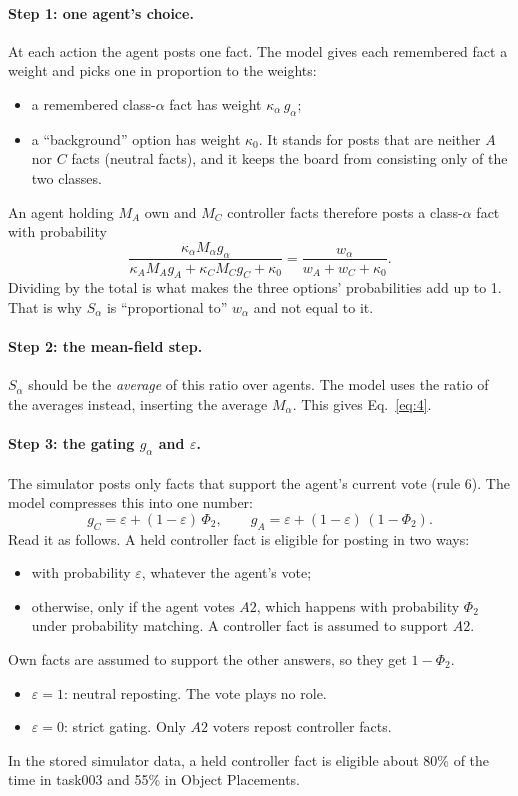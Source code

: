\documentclass[10pt,a4paper]{article}
\begin{document}
\paragraph{Step 1: one agent's choice.} At each action the agent posts one fact. The model gives each remembered fact a
weight and picks one in proportion to the weights:
\begin{itemize}
\item a remembered class-$\alpha$ fact has weight $\kappa_\alpha\,g_\alpha$;
\item a ``background'' option has weight $\kappa_0$. It stands for posts that are neither $A$ nor $C$ facts (neutral
  facts), and it keeps the board from consisting only of the two classes.
\end{itemize}
An agent holding $M_A$ own and $M_C$ controller facts therefore posts a class-$\alpha$ fact with probability
\begin{equation}
\frac{\kappa_\alpha M_\alpha g_\alpha}{\kappa_A M_A g_A+\kappa_C M_C g_C+\kappa_0}=\frac{w_\alpha}{w_A+w_C+\kappa_0}.
\end{equation}
Dividing by the total is what makes the three options' probabilities add up to 1. That is why $S_\alpha$ is
``proportional to'' $w_\alpha$ and not equal to it.

\paragraph{Step 2: the mean-field step.} $S_\alpha$ should be the \emph{average} of this ratio over agents. The model
uses the ratio of the averages instead, inserting the average $M_\alpha$. This gives Eq.~\eqref{eq:4}.

\paragraph{Step 3: the gating $g_\alpha$ and $\varepsilon$.} The simulator posts only facts that support the agent's
current vote (rule 6). The model compresses this into one number:
\begin{equation}
g_C=\varepsilon+(1-\varepsilon)\,\Phi_2,\qquad g_A=\varepsilon+(1-\varepsilon)\,(1-\Phi_2).\label{eq:g}
\end{equation}
Read it as follows. A held controller fact is eligible for posting in two ways:
\begin{itemize}
\item with probability $\varepsilon$, whatever the agent's vote;
\item otherwise, only if the agent votes $A2$, which happens with probability $\Phi_2$ under probability matching. A
  controller fact is assumed to support $A2$.
\end{itemize}
Own facts are assumed to support the other answers, so they get $1-\Phi_2$.
\begin{itemize}
\item $\varepsilon=1$: neutral reposting. The vote plays no role.
\item $\varepsilon=0$: strict gating. Only $A2$ voters repost controller facts.
\end{itemize}
In the stored simulator data, a held controller fact is eligible about 80\% of the time in task003 and 55\% in Object
Placements.
\end{document}
